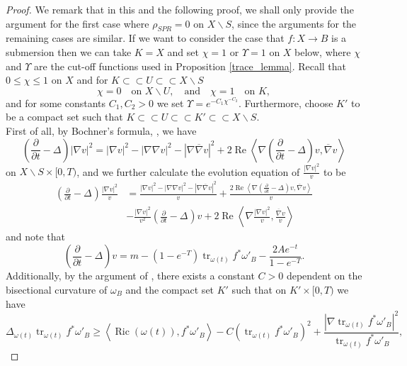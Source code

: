 \documentclass[12pt]{article}
\numberwithin{equation}{section}
\renewcommand{\d}{\partial}
\DeclareMathOperator{\Ric}{Ric}
\DeclareMathOperator{\tr}{tr}
\DeclareMathOperator{\Real}{Re}
\newcommand{\oo}[1]{\overline{#1}}
\newcommand{\parabolic}[1]{\left(\frac{\d}{\d t} - \Delta_{#1}\right)}
\newcommand{\ip}[1]{\left\langle#1\right\rangle}
\begin{document}
\begin{proof}
We remark that in this and the following proof, we shall only provide the argument for the first case where $\rho_{SPR} = 0$ on $X \backslash S$, since the arguments for the remaining cases are similar. If we want to consider the case that $f:X \to B$ is a submersion then we can take $K = X$ and set $\chi = 1$ or $\Upsilon = 1$ on $X$ below, where $\chi$ and $\Upsilon$ are the cut-off functions used in Proposition \ref{trace_lemma}. Recall that $0 \leq \chi \leq 1$ on $X$ and for $K \subset \subset U \subset \subset X \backslash S$
\begin{equation*}
    \chi = 0 \quad \text{on } X \backslash U, \quad \text{and} \quad \chi = 1 \quad \text{on } K,
\end{equation*}
and for some constants $C_1, C_2 > 0$ we set $\Upsilon = e^{-C_1 \chi^{-C_2}}$. Furthermore, choose $K'$ to be a compact set such that $K \subset \subset U \subset \subset K' \subset \subset X \backslash S$.\\ 
First of all, by Bochner's formula, \cite[Prop. 6.4]{B25I}, we have
\begin{equation*}
    \parabolic{}|\nabla v|^2 = |\nabla v|^2 - |\nabla \nabla v|^2 - |\nabla \oo{\nabla} v|^2 + 2 \Real \ip{\nabla \parabolic{}v,\oo{\nabla} v}
\end{equation*}
on $X \backslash S \times [0,T)$, and we further calculate the evolution equation of $\frac{|\nabla v|^2}{v}$ to be
\begin{align*}
    \parabolic{}\frac{|\nabla v|^2}{v} &= \frac{|\nabla v|^2 - |\nabla \nabla v|^2 - |\nabla \oo{\nabla} v|^2}{v}+  \frac{2 \Real\ip{\nabla \parabolic{} v, \oo{\nabla} v}}{v}\\
    &- \frac{|\nabla v|^2}{v^2} \parabolic{} v+ 2 \Real \ip{\nabla \frac{|\nabla v|^2}{v}, \frac{\oo{\nabla} v}{v}}
\end{align*}
and note that
\begin{equation*}
    \parabolic{} v = m-(1-e^{-T})\tr_{\omega(t)} f^*\omega'_B - \frac{2A e^{-t}}{1-e^{-T}}.
\end{equation*}
Additionally, by the argument of \cite[Thm. 4.3]{ST07}, there exists a constant $C > 0$ dependent on the bisectional curvature of $\omega_B$ and the compact set $K'$ such that on $K' \times [0,T)$ we have
\begin{equation*}
    \Delta_{\omega(t)} \tr_{\omega(t)} f^*\omega'_B \geq \ip{\Ric(\omega(t)), f^*\omega'_B} - C (\tr_{\omega(t)} f^*\omega'_B)^2 + \frac{|\nabla\tr_{\omega(t)} f^*\omega'_B|^2}{\tr_{\omega(t)} f^*\omega'_B},

\end{equation*}
\end{proof}
\end{document}
